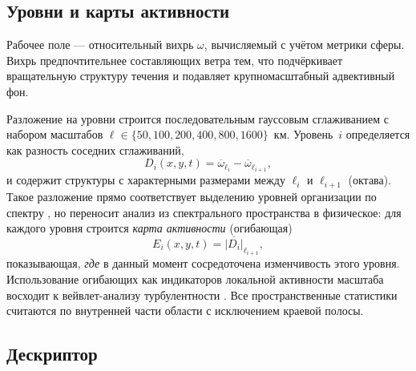 \documentclass[11pt,a4paper]{article}
\begin{document}
\subsection{Уровни и карты активности}

Рабочее поле --- относительный вихрь $\omega$, вычисляемый с учётом метрики сферы. Вихрь предпочтительнее составляющих ветра тем, что подчёркивает вращательную структуру течения и подавляет крупномасштабный адвективный фон.

Разложение на уровни строится последовательным гауссовым сглаживанием с набором масштабов $\ell\in\{50,100,200,400,800,1600\}$~км. Уровень~$i$ определяется как разность соседних сглаживаний,
\begin{equation}
D_i(x,y,t)=\overline{\omega}_{\ell_i}-\overline{\omega}_{\ell_{i+1}},
\end{equation}
и содержит структуры с характерными размерами между $\ell_i$ и $\ell_{i+1}$ (октава). Такое разложение прямо соответствует выделению уровней организации по спектру \cite{Krenke2019}, но переносит анализ из спектрального пространства в физическое: для каждого уровня строится \emph{карта активности} (огибающая)
\begin{equation}
E_i(x,y,t)=\overline{\lvert D_i\rvert}_{\ell_{i+1}},
\end{equation}
показывающая, \emph{где} в данный момент сосредоточена изменчивость этого уровня. Использование огибающих как индикаторов локальной активности масштаба восходит к вейвлет-анализу турбулентности \cite{Farge1992}. Все пространственные статистики считаются по внутренней части области с исключением краевой полосы.

\subsection{Дескриптор}
\end{document}
